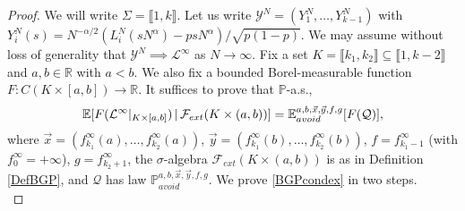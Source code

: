 \begin{proof}
	We will write $\Sigma = \llbracket 1,k\rrbracket$. Let us write $\mathcal{Y}^N = (Y^N_1,\dots,Y^N_{k-1})$ with $Y^N_i(s) = N^{-\alpha/2}(L^N_i(sN^\alpha)-psN^\alpha)/\sqrt{p(1-p)}$. We may assume without loss of generality that $\mathcal{Y}^N \implies \mathcal{L}^\infty$ as $N\to\infty$. Fix a set $K = \llbracket k_1,k_2\rrbracket \subseteq \llbracket 1, k-2\rrbracket$ and $a,b\in\mathbb{R}$ with $a<b$. We also fix a bounded Borel-measurable function $F:C(K\times[a,b])\to\mathbb{R}$. It suffices to prove that $\mathbb{P}$-a.s.,
	\begin{equation}\label{BGPcondex}
		\mathbb{E}[F(\mathcal{L}^\infty|_{K\times[a,b]})\,|\,\mathcal{F}_{ext}(K\times(a,b))] = \mathbb{E}^{a,b,\vec{x},\vec{y},f,g}_{avoid}[F(\mathcal{Q})],
	\end{equation}
	where $\vec{x} = (f^\infty_{k_1}(a),\dots,f^\infty_{k_2}(a))$, $\vec{y} = (f^\infty_{k_1}(b),\dots,f^\infty_{k_2}(b))$, $f=f^\infty_{k_1-1}$ (with $f^\infty_0 = +\infty$), $g=f^\infty_{k_2+1}$, the $\sigma$-algebra $\mathcal{F}_{ext}(K\times(a,b))$ is as in Definition \ref{DefBGP}, and $\mathcal{Q}$ has law $\mathbb{P}^{a,b,\vec{x},\vec{y},f,g}_{avoid}$. We prove \eqref{BGPcondex} in two steps.\\
	

\end{proof}
